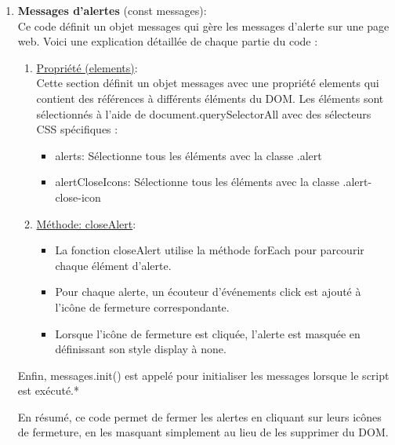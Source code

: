 \documentclass[a4paper,11pt]{article}
\begin{document}
\begin{enumerate}
                \bigskip
                \item \textbf{Messages d'alertes} (const messages): \\
                
                    \noindent Ce code définit un objet messages qui gère les messages d'alerte sur une page web. Voici une explication détaillée de chaque partie du code :
                        \begin{enumerate}
                            \item \underline{Propriété (elements)}: \\
                                \noindent Cette section définit un objet messages avec une propriété elements qui contient des références à différents éléments du DOM. \newline Les éléments sont sélectionnés à l'aide de document.querySelectorAll avec des sélecteurs CSS spécifiques :
                                \begin{itemize}
                                    \item alerts:  Sélectionne tous les éléments avec la classe .alert
                                    \item alertCloseIcons: Sélectionne tous les éléments avec la classe .alert-close-icon
                                \end{itemize}
                            \item \underline{Méthode: closeAlert}:
                                \begin{itemize}
                                    \item La fonction closeAlert utilise la méthode forEach pour parcourir chaque élément d'alerte.
                                    \item Pour chaque alerte, un écouteur d'événements click est ajouté à l'icône de fermeture correspondante.
                                    \item Lorsque l'icône de fermeture est cliquée, l'alerte est masquée en définissant son style display à none.
                                \end{itemize}
                        \end{enumerate}
                    
                    \noindent Enfin, messages.init() est appelé pour initialiser les messages lorsque le script est exécuté.*

                    \begin{tcolorbox}[colback=lightgray!6, colframe=black, left=5mm, right=5mm, top=2mm, bottom=2mm, boxrule=0.1mm]
                        En résumé, ce code permet de fermer les alertes en cliquant sur leurs icônes de fermeture, en les masquant simplement 
                        au lieu de les supprimer du DOM.
                    \end{tcolorbox}


\end{enumerate}
\end{document}
